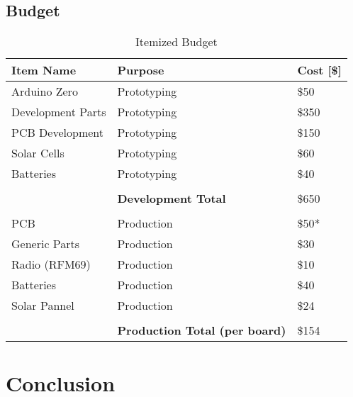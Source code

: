 \documentclass[12pt]{article}
\begin{document}
\subsection{Budget}
\begin{table}[H]
\centering
\caption{Itemized Budget}
\label{my-label}
\begin{tabular}{lll}
\textbf{Item Name}         & \textbf{Purpose}                      & \textbf{Cost {[}\${]}} \\
\hline
Arduino Zero      & Prototyping                  & \$50          \\
Development Parts & Prototyping                  & \$350         \\
PCB Development   & Prototyping                  & \$150         \\
Solar Cells       & Prototyping                  & \$60          \\
Batteries         & Prototyping                  & \$40          \\
\hline
                  &                              &               \\
                   & \textbf{Development Total}            & \$650         \\
                   &								 &\\
PCB               & Production                   & \$50*         \\
Generic Parts     & Production                   & \$30          \\
Radio (RFM69)     & Production                   & \$10          \\
Batteries         & Production                   & \$40          \\
Solar Pannel      & Production                   & \$24          \\
\hline
                  &                              &               \\

                  & \textbf{Production Total (per board)} & \$154
\end{tabular}
\end{table}


\section{Conclusion}
\end{document}
